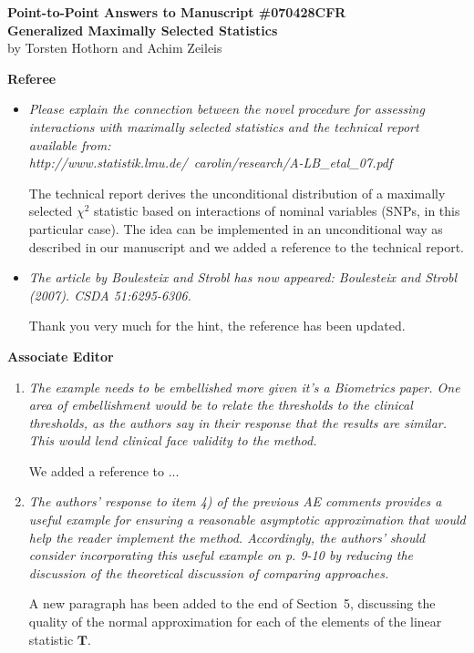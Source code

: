 \documentclass[11pt,a4paper]{article}
\begin{document}


\begin{center}
\textbf{\large Point-to-Point Answers to Manuscript \#070428CFR \\
Generalized Maximally Selected Statistics} \\
by Torsten Hothorn and Achim Zeileis
\end{center}

\vspace*{1cm}

\textbf{\large Referee}

\begin{itemize}

  \item \textit{Please explain the connection between the novel procedure
for assessing interactions with maximally selected statistics and
the technical report available from: \\
http://www.statistik.lmu.de/~carolin/research/A-LB\_etal\_07.pdf}

The technical report derives the unconditional distribution of
a maximally selected $\chi^2$ statistic based on interactions
of nominal variables (SNPs, in this particular case). The idea 
can be implemented in an unconditional way as described in 
our manuscript and we added a reference to the technical report.

\item \textit{The article by Boulesteix and Strobl has now appeared:
Boulesteix and Strobl (2007). CSDA 51:6295-6306.}

Thank you very much for the hint, the reference has been updated.

\end{itemize}

\textbf{\large Associate Editor}

\begin{enumerate}

  \item \textit{The example needs to be embellished more given it's a Biometrics paper. One area of
embellishment would be to relate the thresholds to the clinical thresholds, as the authors
say in their response that the results are similar. This would lend clinical face validity
to the method.}

We added a reference to ...

\item \textit{The authors’ response to item 4) of the previous AE comments provides a useful
example for ensuring a reasonable asymptotic approximation that would help the reader
implement the method. Accordingly, the authors’ should consider incorporating this
useful example on p. 9-10 by reducing the discussion of the theoretical discussion of
comparing approaches.}

A new paragraph has been added to the end of Section~5, discussing the
quality of the normal approximation for each of the elements of the
linear statistic $\mathbf{T}$.

\end{enumerate}
\end{document}
